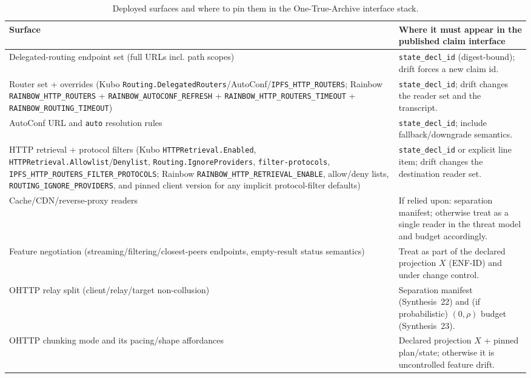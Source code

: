 \documentclass[11pt]{article}
\begin{document}
\begin{table}[t]
\centering
\begin{tabularx}{\linewidth}{@{}>{\raggedright\arraybackslash}X >{\raggedright\arraybackslash}X@{}}
\toprule
Surface & Where it must appear in the published claim interface \\
\midrule
Delegated-routing endpoint set (full URLs incl. path scopes) & \texttt{state\_decl\_id} (digest-bound); drift forces a new claim id. \\
Router set + overrides (Kubo \texttt{Routing.DelegatedRouters}/AutoConf/\texttt{IPFS\_HTTP\_ROUTERS}; Rainbow \texttt{RAINBOW\_HTTP\_ROUTERS} + \texttt{RAINBOW\_AUTOCONF\_\allowbreak REFRESH} + \texttt{RAINBOW\_HTTP\_ROUTERS\_\allowbreak TIMEOUT} + \texttt{RAINBOW\_ROUTING\_\allowbreak TIMEOUT}) & \texttt{state\_decl\_id}; drift changes the reader set and the transcript. \\
AutoConf URL and \texttt{auto} resolution rules & \texttt{state\_decl\_id}; include fallback/downgrade semantics. \\
HTTP retrieval + protocol filters (Kubo \texttt{HTTPRetrieval.Enabled}, \texttt{HTTPRetrieval.Allowlist}/\texttt{Denylist}, \texttt{Routing.IgnoreProviders}, \texttt{filter-protocols}, \texttt{IPFS\_HTTP\_ROUTERS\_\allowbreak FILTER\_\allowbreak PROTOCOLS}; Rainbow \texttt{RAINBOW\_HTTP\_RETRIEVAL\_ENABLE}, allow/deny lists, \texttt{ROUTING\_IGNORE\_PROVIDERS}, and pinned client version for any implicit protocol-filter defaults) & \texttt{state\_decl\_id} or explicit line item; drift changes the destination reader set. \\
Cache/CDN/reverse-proxy readers & If relied upon: separation manifest; otherwise treat as a single reader in the threat model and budget accordingly. \\
Feature negotiation (streaming/filtering/closest-peers endpoints, empty-result status semantics) & Treat as part of the declared projection $X$ (ENF-ID) and under change control. \\
OHTTP relay split (client/relay/target non-collusion) & Separation manifest (Synthesis~22) and (if probabilistic) $(0,\rho)$ budget (Synthesis~23). \\
OHTTP chunking mode and its pacing/shape affordances & Declared projection $X$ + pinned plan/state; otherwise it is uncontrolled feature drift. \\
\bottomrule
\end{tabularx}
\caption{Deployed surfaces and where to pin them in the One-True-Archive interface stack.}
\label{tab:pinning}
\end{table}
\end{document}
